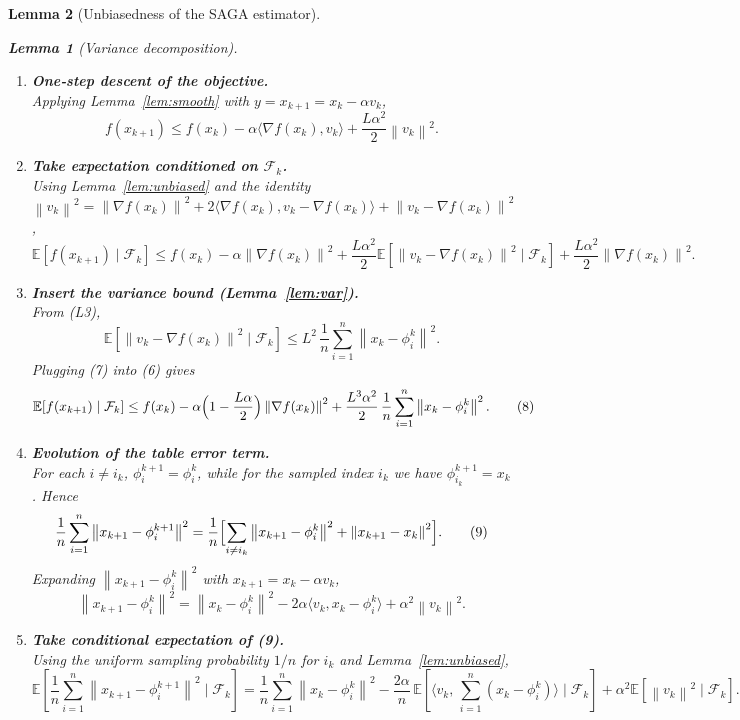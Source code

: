 \documentclass{article}
\newtheorem{lemma}{Lemma}
\newcommand{\E}{\mathbb{E}}
\newcommand{\norm}[1]{\left\|#1\right\|}
\begin{document}
\begin{lemma}[Unbiasedness of the SAGA estimator]
\begin{lemma}[Variance decomposition]
\begin{enumerate}[label=[Step \arabic*],leftmargin=*]
\item \textbf{One‑step descent of the objective.}\\
Applying Lemma~\ref{lem:smooth} with $y=x_{k+1}=x_k-\alpha v_k$,
\[
f(x_{k+1})\le f(x_k)-\alpha\langle\nabla f(x_k),v_k\rangle
               +\frac{L\alpha^{2}}{2}\norm{v_k}^{2}.
\tag{5}
\]

\item \textbf{Take expectation conditioned on $\mathcal{F}_k$.}\\
Using Lemma~\ref{lem:unbiased} and the identity
$\norm{v_k}^{2}= \norm{\nabla f(x_k)}^{2}
                +2\langle\nabla f(x_k),v_k-\nabla f(x_k)\rangle
                +\norm{v_k-\nabla f(x_k)}^{2}$,
\[
\E\!\left[f(x_{k+1})\mid\mathcal{F}_k\right]
\le f(x_k)-\alpha\norm{\nabla f(x_k)}^{2}
   +\frac{L\alpha^{2}}{2}\E\!\left[\norm{v_k-\nabla f(x_k)}^{2}\mid\mathcal{F}_k\right]
   +\frac{L\alpha^{2}}{2}\norm{\nabla f(x_k)}^{2}.
\tag{6}
\]

\item \textbf{Insert the variance bound (Lemma~\ref{lem:var}).}\\
From (L3),
\[
\E\!\left[\norm{v_k-\nabla f(x_k)}^{2}\mid\mathcal{F}_k\right]
\le L^{2}\,\frac{1}{n}\sum_{i=1}^{n}\norm{x_k-\phi_i^{k}}^{2}.
\tag{7}
\]
Plugging (7) into (6) gives
\[
\E\!\left[f(x_{k+1})\mid\mathcal{F}_k\right]
\le f(x_k)-\alpha\Bigl(1-\frac{L\alpha}{2}\Bigr)\norm{\nabla f(x_k)}^{2}
     +\frac{L^{3}\alpha^{2}}{2}\,\frac{1}{n}\sum_{i=1}^{n}\norm{x_k-\phi_i^{k}}^{2}.
\tag{8}
\]

\item \textbf{Evolution of the table error term.}\\
For each $i\neq i_k$, $\phi_i^{k+1}=\phi_i^{k}$, while for the sampled
index $i_k$ we have $\phi_{i_k}^{k+1}=x_k$. Hence
\[
\frac{1}{n}\sum_{i=1}^{n}\norm{x_{k+1}-\phi_i^{k+1}}^{2}
=
\frac{1}{n}\Bigl[\sum_{i\neq i_k}\norm{x_{k+1}-\phi_i^{k}}^{2}
                +\norm{x_{k+1}-x_k}^{2}\Bigr].
\tag{9}
\]
Expanding $\norm{x_{k+1}-\phi_i^{k}}^{2}$ with $x_{k+1}=x_k-\alpha v_k$,
\[
\norm{x_{k+1}-\phi_i^{k}}^{2}
= \norm{x_k-\phi_i^{k}}^{2}
  -2\alpha\langle v_k, x_k-\phi_i^{k}\rangle
  +\alpha^{2}\norm{v_k}^{2}.
\tag{10}
\]

\item \textbf{Take conditional expectation of (9).}\\
Using the uniform sampling probability $1/n$ for $i_k$ and Lemma~\ref{lem:unbiased},
\[
\E\!\left[\frac{1}{n}\sum_{i=1}^{n}\norm{x_{k+1}-\phi_i^{k+1}}^{2}\mid\mathcal{F}_k\right]
=
\frac{1}{n}\sum_{i=1}^{n}\norm{x_k-\phi_i^{k}}^{2}
   -\frac{2\alpha}{n}\,\E\!\left[\langle v_k,\,\sum_{i=1}^{n}(x_k-\phi_i^{k})\rangle\mid\mathcal{F}_k\right]
   +\alpha^{2}\E\!\left[\norm{v_k}^{2}\mid\mathcal{F}_k\right].
\tag{11}
\]


\end{enumerate}
\end{lemma}
\end{lemma}
\end{document}
